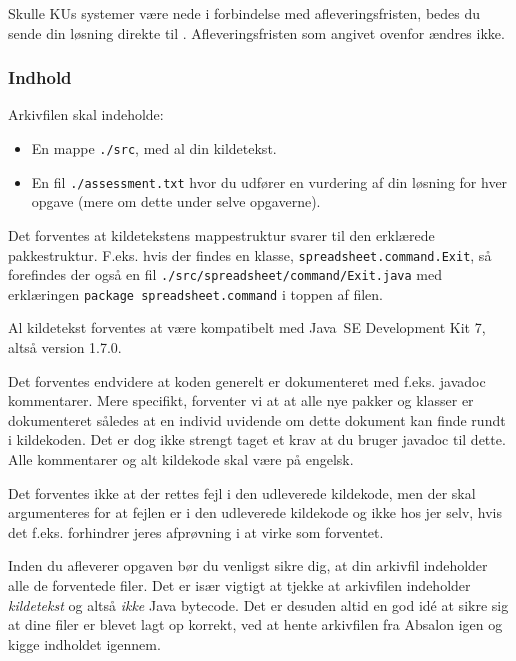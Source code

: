 Skulle KUs systemer være nede i forbindelse med afleveringsfristen,
bedes du sende din løsning direkte til
. Afleveringsfristen som angivet ovenfor ændres ikke.

\subsubsection{Indhold}

\label{sec:indhold}

Arkivfilen skal indeholde:

\begin{itemize}

\item En mappe \texttt{./src}, med al din kildetekst.

\item En fil \texttt{./assessment.txt} hvor du udfører en vurdering af din
løsning for hver opgave (mere om dette under selve opgaverne).

\end{itemize}

Det forventes at kildetekstens mappestruktur svarer til den erklærede
pakkestruktur. F.eks. hvis der findes en klasse,
\texttt{spreadsheet.command.Exit}, så forefindes der også en fil
\texttt{./src/spreadsheet/command/Exit.java} med erklæringen \texttt{package
spreadsheet.command} i toppen af filen.

Al kildetekst forventes at være kompatibelt med Java\texttrademark~SE
Development Kit 7, altså version 1.7.0.

Det forventes endvidere at koden generelt er dokumenteret med f.eks. javadoc
kommentarer\footnotemark. Mere specifikt, forventer vi at at alle nye pakker og
klasser er dokumenteret således at en individ uvidende om dette dokument kan
finde rundt i kildekoden. Det er dog ikke strengt taget et krav at du bruger
javadoc til dette. Alle kommentarer og alt kildekode skal være på engelsk.


Det forventes ikke at der rettes fejl i den udleverede kildekode, men der skal
argumenteres for at fejlen er i den udleverede kildekode og ikke hos jer selv,
hvis det f.eks. forhindrer jeres afprøvning i at virke som forventet.

Inden du afleverer opgaven bør du venligst sikre dig, at din arkivfil
indeholder alle de forventede filer. Det er især vigtigt at tjekke at
arkivfilen indeholder \emph{kildetekst} og altså \emph{ikke} Java bytecode. Det
er desuden altid en god idé at sikre sig at dine filer er blevet lagt op
korrekt, ved at hente arkivfilen fra Absalon igen og kigge indholdet igennem.

